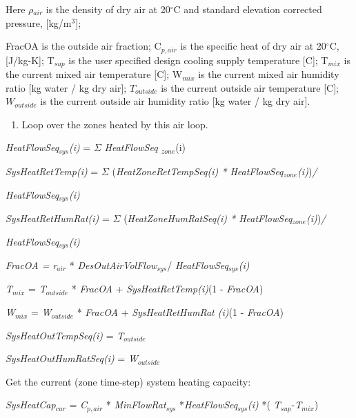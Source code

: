 Here $\rho$\(_{air}\) is the density of dry air at 20\(^{\circ}\)C and standard elevation corrected pressure, {[}kg/m\(^{3}\){]};

{\setlength\parindent{25pt} FracOA is the outside air fraction; }
{\setlength\parindent{25pt} C\(_{p,air}\) is the specific heat of dry air at 20\(^{\circ}\)C, {[}J/kg-K{]}; }
{\setlength\parindent{25pt} T\(_{sup}\) is the user specified design cooling supply temperature {[}C{]}; }
{\setlength\parindent{25pt} T\(_{mix}\) is the current mixed air temperature {[}C{]}; }
{\setlength\parindent{25pt} W\(_{mix}\) is the current mixed air humidity ratio {[}kg water / kg dry air{]}; }
{\setlength\parindent{25pt} \(T_{outside}\) is the current outside air temperature {[}C{]}; }
{\setlength\parindent{25pt} \(W_{outside}\) is the current outside air humidity ratio {[}kg water / kg dry air{]}. }

\begin{enumerate}
\def\labelenumi{(\arabic{enumi})}
\setcounter{enumi}{1}
\tightlist
\item
  Loop over the zones heated by this air loop.
\end{enumerate}

\emph{HeatFlowSeq\(_{sys}\)(i)} = $\Sigma$ \emph{HeatFlowSeq \(_{zone}\)}(i)

\emph{SysHeatRetTemp(i)} = $\Sigma$ (\emph{HeatZoneRetTempSeq(i) * HeatFlowSeq\(_{zone}\)(i)})\emph{/}

\emph{HeatFlowSeq\(_{sys}\)(i)}

\emph{SysHeatRetHumRat(i)} = $\Sigma$ (\emph{HeatZoneHumRatSeq(i) * HeatFlowSeq\(_{zone}\)(i)})\emph{/}

\emph{HeatFlowSeq\(_{sys}\)(i)}

\emph{FracOA = r\(_{air}\)} * \emph{DesOutAirVolFlow\(_{sys}\)}/ \emph{HeatFlowSeq\(_{sys}\)(i)}

\emph{T\(_{mix}\)} = \emph{T\(_{outside}\)} * \emph{FracOA} + \emph{SysHeatRetTemp(i)}(1 - \emph{FracOA})

\emph{W\(_{mix}\)} = \emph{W\(_{outside}\)} * \emph{FracOA} + \emph{SysHeatRetHumRat (i)}(1 - \emph{FracOA})

\emph{SysHeatOutTempSeq(i)} = \emph{T\(_{outside}\)}

\emph{SysHeatOutHumRatSeq(i)} = \emph{W\(_{outside}\)}

Get the current (zone time-step) system heating capacity:

\emph{SysHeatCap\(_{cur}\)} = \emph{C\(_{p,air}\)} * \emph{MinFlowRat\(_{sys}\)} *\emph{HeatFlowSeq\(_{sys}\)(i)} *( \emph{T\(_{sup}\)}-\emph{T\(_{mix}\)})


